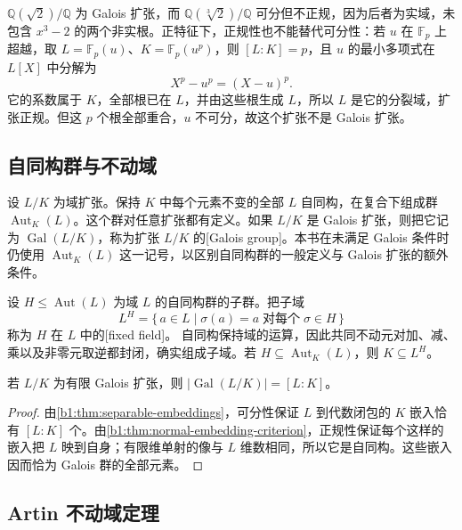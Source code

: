 \ProseParagraphBreak
\(\mathbb Q(\sqrt2)/\mathbb Q\) 为 Galois 扩张，而 \(\mathbb Q(\sqrt[3]2)/\mathbb Q\) 可分但不正规，因为后者为实域，未包含 \(x^3-2\) 的两个非实根。正特征下，正规性也不能替代可分性：若 \(u\) 在 \(\mathbb F_p\) 上超越，取 \(L=\mathbb F_p(u)\)、\(K=\mathbb F_p(u^p)\)，则 \([L:K]=p\)，且 \(u\) 的最小多项式在 \(L[X]\) 中分解为
\[
	X^p-u^p=(X-u)^p.
\]
它的系数属于 \(K\)，全部根已在 \(L\)，并由这些根生成 \(L\)，所以 \(L\) 是它的分裂域，扩张正规。但这 \(p\) 个根全部重合，\(u\) 不可分，故这个扩张不是 Galois 扩张。

\subsection{自同构群与不动域}
\label{b1:subsec:1901:02}

设 \(L/K\) 为域扩张。保持 \(K\) 中每个元素不变的全部 \(L\) 自同构，在复合下组成群 \(\operatorname{Aut}_K(L)\)。这个群对任意扩张都有定义。如果 \(L/K\) 是 Galois 扩张，则把它记为 \(\operatorname{Gal}(L/K)\)，称为扩张 \(L/K\) 的[Galois group]。本书在未满足 Galois 条件时仍使用 \(\operatorname{Aut}_K(L)\) 这一记号，以区别自同构群的一般定义与 Galois 扩张的额外条件。

\ProseParagraphBreak
设 \(H\leq\operatorname{Aut}(L)\) 为域 \(L\) 的自同构群的子群。把子域
\[
	L^H=\bigl\{\,a\in L\mid \sigma(a)=a\;\text{对每个}\;\sigma\in H\,\bigr\}
\]
称为 \(H\) 在 \(L\) 中的[fixed field]。
自同构保持域的运算，因此共同不动元对加、减、乘以及非零元取逆都封闭，确实组成子域。若 \(H\subseteq\operatorname{Aut}_K(L)\)，则 \(K\subseteq L^H\)。

\begin{proposition}\label{b1:prop:galois-automorphism-count}
	若 \(L/K\) 为有限 Galois 扩张，则 \(|\operatorname{Gal}(L/K)|=[L:K]\)。
\end{proposition}
\begin{proof}
	由\cref{b1:thm:separable-embeddings}，可分性保证 \(L\) 到代数闭包的 \(K\) 嵌入恰有 \([L:K]\) 个。由\cref{b1:thm:normal-embedding-criterion}，正规性保证每个这样的嵌入把 \(L\) 映到自身；有限维单射的像与 \(L\) 维数相同，所以它是自同构。这些嵌入因而恰为 Galois 群的全部元素。
\end{proof}

\subsection{Artin 不动域定理}
\label{b1:subsec:1901:03}

